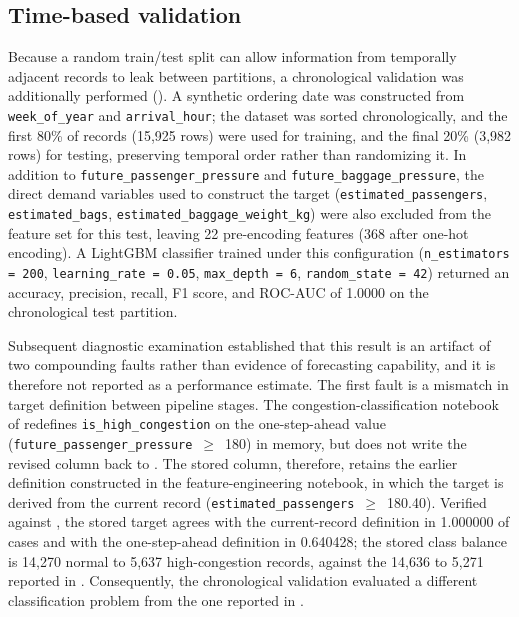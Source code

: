 \subsection{Time-based validation}
\label{subsec:time-based-validation}

Because a random train/test split can allow information from temporally adjacent records to leak between partitions, a chronological validation was additionally performed (). A synthetic ordering date was constructed from \nolinkurl{week_of_year} and \nolinkurl{arrival_hour}; the dataset was sorted chronologically, and the first 80\% of records (15,925 rows) were used for training, and the final 20\% (3,982 rows) for testing, preserving temporal order rather than randomizing it. In addition to \nolinkurl{future_passenger_pressure} and \nolinkurl{future_baggage_pressure}, the direct demand variables used to construct the target (\nolinkurl{estimated_passengers}, \nolinkurl{estimated_bags}, \nolinkurl{estimated_baggage_weight_kg}) were also excluded from the feature set for this test, leaving 22 pre-encoding features (368 after one-hot encoding). A LightGBM classifier trained under this configuration (\texttt{n\_estimators = 200}, \texttt{learning\_rate = 0.05}, \texttt{max\_depth = 6}, \texttt{random\_state = 42}) returned an accuracy, precision, recall, F1 score, and ROC-AUC of 1.0000 on the chronological test partition.

Subsequent diagnostic examination established that this result is an artifact of two compounding faults rather than evidence of forecasting capability, and it is therefore not reported as a performance estimate. The first fault is a mismatch in target definition between pipeline stages. The congestion-classification notebook of  redefines \nolinkurl{is_high_congestion} on the one-step-ahead value (\nolinkurl{future_passenger_pressure}~$\geq$~180) in memory, but does not write the revised column back to . The stored column, therefore, retains the earlier definition constructed in the feature-engineering notebook, in which the target is derived from the current record (\nolinkurl{estimated_passengers}~$\geq$~180.40). Verified against , the stored target agrees with the current-record definition in 1.000000 of cases and with the one-step-ahead definition in 0.640428; the stored class balance is 14,270 normal to 5,637 high-congestion records, against the 14,636 to 5,271 reported in . Consequently, the chronological validation evaluated a different classification problem from the one reported in .

